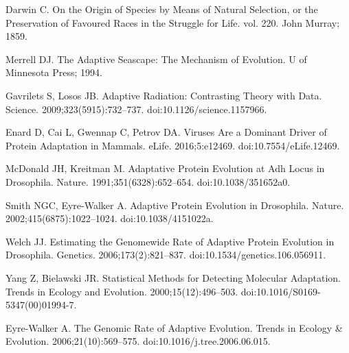 \documentclass[10pt,letterpaper]{article}
\begin{document}
%
%
%
\begin{thebibliography}{10}

Darwin C.
\newblock On the {{Origin}} of {{Species}} by {{Means}} of {{Natural
Selection}}, or the {{Preservation}} of {{Favoured Races}} in the
{{Struggle}} for {{Life}}. vol. 220.
\newblock John Murray; 1859.

Merrell DJ.
\newblock The {{Adaptive Seascape}}: {{The Mechanism}} of {{Evolution}}.
\newblock U of Minnesota Press; 1994.

Gavrilets S, Losos JB.
\newblock Adaptive {{Radiation}}: {{Contrasting Theory}} with {{Data}}.
\newblock Science. 2009;323(5915):732--737.
\newblock doi:{10.1126/science.1157966}.

Enard D, Cai L, Gwennap C, Petrov DA.
\newblock Viruses Are a Dominant Driver of Protein Adaptation in Mammals.
\newblock eLife. 2016;5:e12469.
\newblock doi:{10.7554/eLife.12469}.

McDonald JH, Kreitman M.
\newblock Adaptative Protein Evolution at {{Adh}} Locus in {{Drosophila}}.
\newblock Nature. 1991;351(6328):652--654.
\newblock doi:{10.1038/351652a0}.

Smith NGC, {Eyre-Walker} A.
\newblock Adaptive Protein Evolution in {{Drosophila}}.
\newblock Nature. 2002;415(6875):1022--1024.
\newblock doi:{10.1038/4151022a}.

Welch JJ.
\newblock Estimating the {{Genomewide Rate}} of {{Adaptive Protein Evolution}}
in {{Drosophila}}.
\newblock Genetics. 2006;173(2):821--837.
\newblock doi:{10.1534/genetics.106.056911}.

Yang Z, Bielawski JR.
\newblock Statistical Methods for Detecting Molecular Adaptation.
\newblock Trends in Ecology and Evolution. 2000;15(12):496--503.
\newblock doi:{10.1016/S0169-5347(00)01994-7}.

{Eyre-Walker} A.
\newblock The Genomic Rate of Adaptive Evolution.
\newblock Trends in Ecology \& Evolution. 2006;21(10):569--575.
\newblock doi:{10.1016/j.tree.2006.06.015}.


\end{thebibliography}
\end{document}
